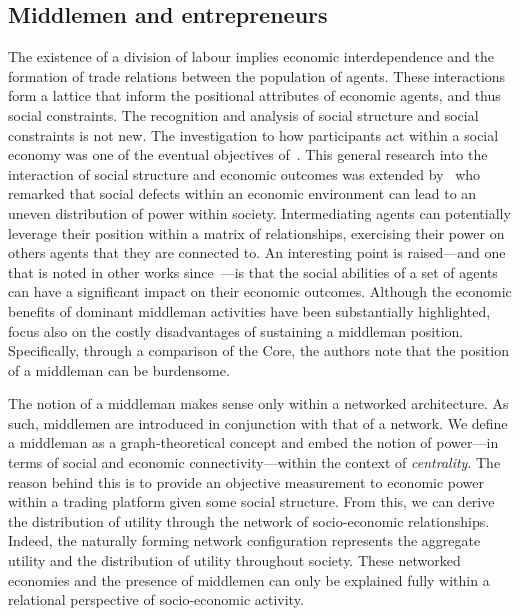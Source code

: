 
\subsection{Middlemen and entrepreneurs}

The existence of a division of labour implies economic interdependence and the formation of trade relations between the population of agents. These interactions form a lattice that inform the positional attributes of economic agents, and thus social constraints. The recognition and analysis of social structure and social constraints is not new. The investigation to how participants act within a social economy was one of the eventual objectives of~\citet{vNM}. This general research into the interaction of social structure and economic outcomes was extended by~\citet{KalaiMiddlemen1978} who remarked that social defects within an economic environment can lead to an uneven distribution of power within society. Intermediating agents can potentially leverage their position within a matrix of relationships, exercising their power on others agents that they are connected to. An interesting point is raised---and one that is noted in other works since~\citet{Granovetter2005}---is that the social abilities of a set of agents can have a significant impact on their economic outcomes. Although the economic benefits of dominant middleman activities have been substantially highlighted,~\citet{KalaiMiddlemen1978} focus also on the costly disadvantages of sustaining a middleman position. Specifically, through a comparison of the Core, the authors note that the position of a middleman can be burdensome.

The notion of a middleman makes sense only within a networked architecture. As such, middlemen are introduced in conjunction with that of a network. We define a middleman as a graph-theoretical concept and embed the notion of power---in terms of social and economic connectivity---within the context of \emph{centrality}. The reason behind this is to provide an objective measurement to economic power within a trading platform given some social structure. From this, we can derive the distribution of utility through the network of socio-economic relationships. Indeed, the naturally forming network configuration represents the aggregate utility and the distribution of utility throughout society. These networked economies and the presence of middlemen can only be explained fully within a relational perspective of socio-economic activity.

